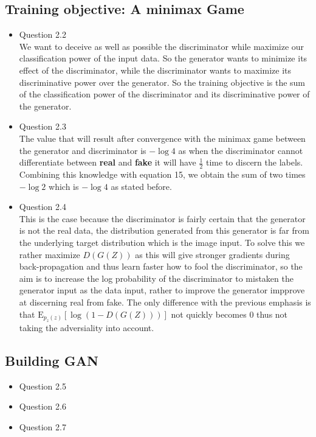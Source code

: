 \documentclass{article}
\begin{document}
    \subsection{Training objective: A minimax Game}
      \begin{itemize}
        \item Question 2.2 \\
        We want to deceive as well as possible the discriminator while maximize our classification power of the input data. So the generator wants to minimize its effect of the discriminator, while the discriminator wants to maximize its discriminative power over the generator. So the training objective is the sum of  the classification power of the discriminator and its discriminative power of the generator.
        \item Question 2.3 \\
        The value that will result after convergence with the minimax game between the generator and discriminator is  $-\log 4$ as when the discriminator cannot differentiate between \textbf{real} and \textbf{fake} it will have $\frac{1}{2} $ time to discern the labels. Combining this knowledge with equation 15, we obtain the sum of two times $-\log{2}$ which is $-\log{4}$ as stated before. 
        \item Question 2.4 \\
        This is the case because the discriminator is fairly certain that the generator is not the real data, the distribution generated from this generator is far from the underlying target distribution which is the image input. To solve this we rather maximize $D(G(Z))$ as this will give stronger gradients during back-propagation and thus learn faster how to fool the discriminator, so the aim is to increase the log probability of the discriminator to mistaken the generator input as the data input, rather to improve the generator impprove at discerning real from fake. The only difference with the previous emphasis is that $\mathrm{E}_{p_z(z)}\left[ \log \left( 1 - D(G(Z)) \right) \right]$ not quickly becomes $0$ thus not taking the adversiality into account. 
      \end{itemize}
    \subsection{Building GAN}
      \begin{itemize}
        \item Question 2.5
        \item Question 2.6
        \item Question 2.7
      \end{itemize}
\end{document}

